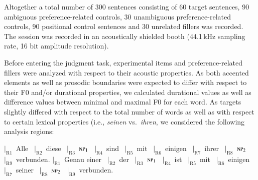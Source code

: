 \documentclass[fleqn,reqno,10pt,draft]{article}
\begin{document}
Altogether a total number of 300 sentences consisting of 60 target sentences, 90 ambiguous preference-related controls, 30 unambiguous preference-related controls, 90 positional control sentences and 30 unrelated fillers was recorded. The session was recorded in an acoustically
shielded booth (44.1\,kHz sampling rate, 16 bit amplitude resolution).

Before entering the judgment task, experimental items and
preference-related fillers were analyzed with respect to their acoustic
properties. As both accented elements as well as prosodic boundaries
were expected to differ with respect to their F0 and/or durational
properties, we calculated durational values as well as difference
values between minimal and maximal F0 for each word. As targets
slightly differed with respect to the total number of words as well as
with respect to certain lexical properties (i.e., \emph{seinen}
vs.~\emph{ihren}, we considered the following analysis regions:

\begin{exe}
  \ex
    \begin{xlist}
      \ex $|_{\text{R}1}$~Alle  	\ $|_{\text{R}2}$~diese 
      \ $|_{\text{R}3}$~$\textsc{np}_1$  
      \ $|_{\text{R}4}$~sind  \ $|_{\text{R}5}$~mit  \
      $|_{\text{R}6}$~einigen  \ $|_{\text{R}7}$~ihrer 
       \ $|_{\text{R}8}$~{$\textsc{np}_2$}  \ $|_{\text{R}9}$~verbunden.
    \ex       $|_{\text{R}1}$~Genau einer  	\ $|_{\text{R}2}$~der 
      \ $|_{\text{R}3}$~$\textsc{np}_1$  
      \ $|_{\text{R}4}$~ist  \ $|_{\text{R}5}$~mit  \
      $|_{\text{R}6}$~einigen  \ $|_{\text{R}7}$~seiner 
       \ $|_{\text{R}8}$~{$\textsc{np}_2$}  \ $|_{\text{R}9}$~verbunden.
    \end{xlist}
\end{exe}
\end{document}
